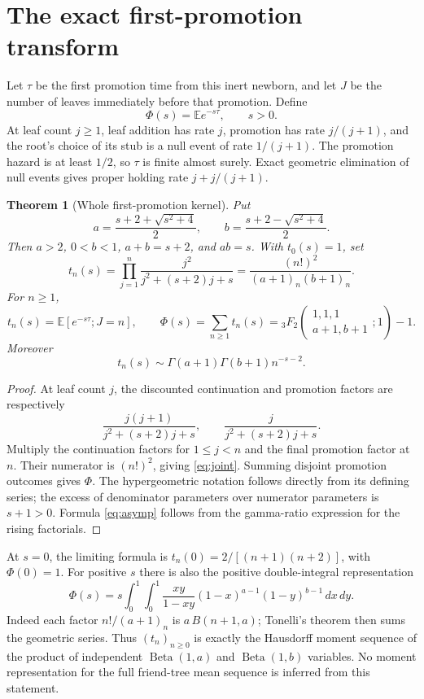 \documentclass[11pt]{article}
\newtheorem{theorem}{Theorem}[section]
\theoremstyle{remark}
\newcommand{\E}{\mathbb E}
\begin{document}
\section{The exact first-promotion transform}

Let $\tau$ be the first promotion time from this inert newborn, and let
$J$ be the number of leaves immediately before that promotion. Define
\[
 \Phi(s)=\E e^{-s\tau},\qquad s>0.
\]
At leaf count $j\ge1$, leaf addition has rate $j$, promotion has rate
$j/(j+1)$, and the root's choice of its stub is a null event of rate
$1/(j+1)$. The promotion hazard is at least $1/2$, so $\tau$ is finite
almost surely. Exact geometric elimination of null events gives proper
holding rate $j+j/(j+1)$.

\begin{theorem}[Whole first-promotion kernel]\label{thm:kernel}
Put
\[
 a=\frac{s+2+\sqrt{s^2+4}}2,\qquad
 b=\frac{s+2-\sqrt{s^2+4}}2.
\]
Then $a>2$, $0<b<1$, $a+b=s+2$, and $ab=s$. With $t_0(s)=1$, set
\begin{equation}\label{eq:tn}
 t_n(s)=\prod_{j=1}^n\frac{j^2}{j^2+(s+2)j+s}
       =\frac{(n!)^2}{(a+1)_n(b+1)_n}.
\end{equation}
For $n\ge1$,
\begin{equation}\label{eq:joint}
 t_n(s)=\E[e^{-s\tau};J=n],\qquad
 \Phi(s)=\sum_{n\ge1}t_n(s)
 ={}_3F_2\!\left(\begin{matrix}1,1,1\\a+1,b+1\end{matrix};1\right)-1.
\end{equation}
Moreover
\begin{equation}\label{eq:asymp}
 t_n(s)\sim\Gamma(a+1)\Gamma(b+1)n^{-s-2}.
\end{equation}
\end{theorem}
\begin{proof}
At leaf count $j$, the discounted continuation and promotion factors are
respectively
\[
 \frac{j(j+1)}{j^2+(s+2)j+s},\qquad
 \frac{j}{j^2+(s+2)j+s}.
\]
Multiply the continuation factors for $1\le j<n$ and the final
promotion factor at $n$. Their numerator is $(n!)^2$, giving
\eqref{eq:joint}. Summing disjoint promotion outcomes gives $\Phi$.
The hypergeometric notation follows directly from its defining
series\cite{DLMF}; the excess of denominator parameters over numerator
parameters is $s+1>0$. Formula \eqref{eq:asymp} follows from the
gamma-ratio expression for the rising factorials.
\end{proof}

At $s=0$, the limiting formula is $t_n(0)=2/[(n+1)(n+2)]$, with
$\Phi(0)=1$. For positive $s$ there is also the positive double-integral
representation
\begin{equation}\label{eq:double}
 \Phi(s)=s\int_0^1\int_0^1
 \frac{xy}{1-xy}(1-x)^{a-1}(1-y)^{b-1}\,dx\,dy.
\end{equation}
Indeed each factor $n!/(a+1)_n$ is $a\,B(n+1,a)$; Tonelli's theorem
then sums the geometric series. Thus $(t_n)_{n\ge0}$ is exactly the
Hausdorff moment sequence of the product of independent
$\operatorname{Beta}(1,a)$ and $\operatorname{Beta}(1,b)$ variables.
No moment representation for the full friend-tree mean sequence is
inferred from this statement.
\end{document}
